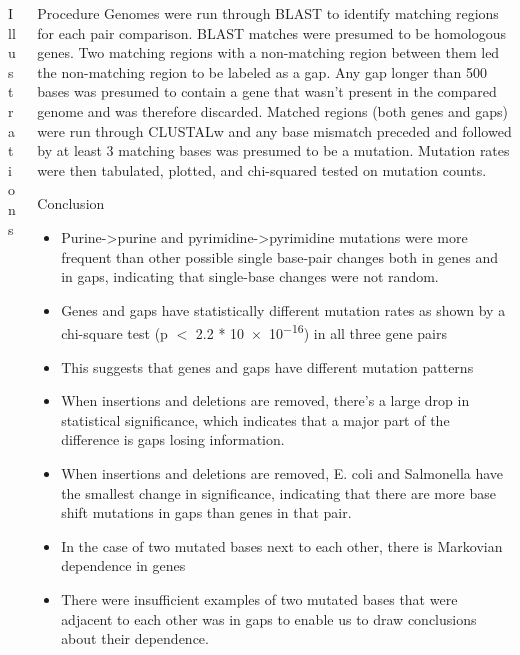 \documentclass[final]{beamer}
\begin{document}
\begin{frame}{}
\begin{columns}[t]
\begin{column}{.32 \linewidth}
\begin{block}{\large Illustrations}
				
			\end{block}
			
			
		\end{column}
		
		
		
		
		\begin{column}{.32 \linewidth}
			
			\begin{block}{Procedure}
				Genomes were run through BLAST to identify matching regions for each pair comparison. BLAST matches were presumed to be homologous genes. Two matching regions with a non-matching region between them led the non-matching region to be labeled as a gap. Any gap longer than 500 bases was presumed to contain a gene that wasn't present in the compared genome and was therefore discarded.
				\newline
				Matched regions (both genes and gaps) were run through CLUSTALw and any base mismatch preceded and followed by at least 3 matching bases was presumed to be a mutation. Mutation rates were then tabulated, plotted, and chi-squared tested on mutation counts.
			\end{block}
			\begin{block}{\large Conclusion}
				\begin{itemize}
					\item Purine->purine and pyrimidine->pyrimidine mutations were more frequent than other possible single base-pair changes both in genes and in gaps, indicating that single-base changes were not random.
					\item 
					Genes and gaps have statistically different mutation rates as shown by a chi-square test (p $<$ \num{2.2} * \num{10e-16}) in all three gene pairs
					\item This suggests that genes and gaps have different mutation patterns
					\item When insertions and deletions are removed, there's a large drop in statistical significance, which indicates that a major part of the difference is gaps losing information.
					\item When insertions and deletions are removed, E. coli and Salmonella have the smallest change in significance, indicating that there are more base shift mutations in gaps than genes in that pair.
					\item In the case of two mutated bases next to each other, there is Markovian dependence in genes
					\item There were insufficient examples of two mutated bases that were adjacent to each other was in gaps to enable us to draw conclusions about their dependence.
					

\end{itemize}
\end{block}
\end{column}
\end{columns}
\end{frame}
\end{document}
